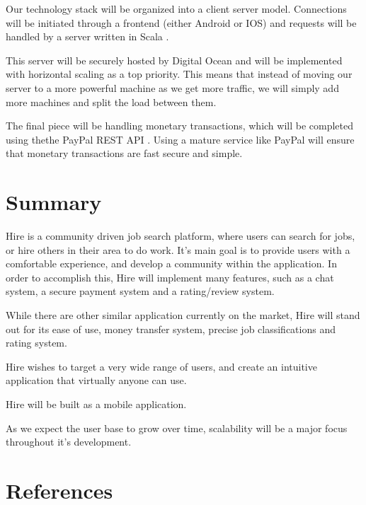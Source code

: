 \documentclass[11pt]{article}
\begin{document}
Our technology stack will be organized into a client server model. 
Connections will be initiated through a frontend (either Android or IOS) and requests will be handled by a server written in Scala \cite{scala}. 

This server will be securely hosted by Digital Ocean and will be implemented with horizontal scaling as a top priority. This means that instead of moving our server to a more powerful machine as we get more traffic, we will simply add more machines and split the load between them.

The final piece will be handling monetary transactions, which will be completed using thethe PayPal REST API \cite{paypal}. Using a mature service like PayPal will ensure that monetary transactions are fast secure and simple.

%
\section{Summary}

Hire is a community driven job search platform, where users can search for jobs, or hire others in their area to do work. It's main goal is to provide users with a comfortable experience, and develop a community within the application. In order to accomplish this, Hire will implement many features, such as a chat system, a secure payment system and a rating/review system.

While there are other similar application currently on the market, Hire will stand out for its ease of use, money transfer system, precise job classifications and rating system.

Hire wishes to target a very wide range of users, and create an intuitive application that virtually anyone can use.

Hire will be built as a mobile application.

As we expect the user base to grow over time, scalability will be a major focus throughout it's development. 

 
    \section{References} 
    
    
\end{document}
